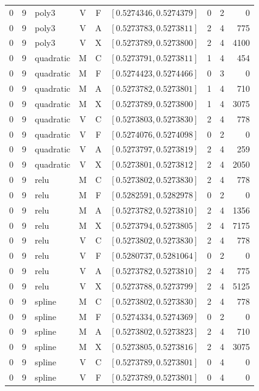 \begin{longtable}{r r l c c l r r r}
0 & 9 & poly3 & V & F & $[0.5274346,0.5274379]$ & 0 & 2 & 0 \\
0 & 9 & poly3 & V & A & $[0.5273783,0.5273811]$ & 2 & 4 & 775 \\
0 & 9 & poly3 & V & X & $[0.5273789,0.5273800]$ & 2 & 4 & 4100 \\
0 & 9 & quadratic & M & C & $[0.5273791,0.5273811]$ & 1 & 4 & 454 \\
0 & 9 & quadratic & M & F & $[0.5274423,0.5274466]$ & 0 & 3 & 0 \\
0 & 9 & quadratic & M & A & $[0.5273782,0.5273801]$ & 1 & 4 & 710 \\
0 & 9 & quadratic & M & X & $[0.5273789,0.5273800]$ & 1 & 4 & 3075 \\
0 & 9 & quadratic & V & C & $[0.5273803,0.5273830]$ & 2 & 4 & 778 \\
0 & 9 & quadratic & V & F & $[0.5274076,0.5274098]$ & 0 & 2 & 0 \\
0 & 9 & quadratic & V & A & $[0.5273797,0.5273819]$ & 2 & 4 & 259 \\
0 & 9 & quadratic & V & X & $[0.5273801,0.5273812]$ & 2 & 4 & 2050 \\
0 & 9 & relu & M & C & $[0.5273802,0.5273830]$ & 2 & 4 & 778 \\
0 & 9 & relu & M & F & $[0.5282591,0.5282978]$ & 0 & 2 & 0 \\
0 & 9 & relu & M & A & $[0.5273782,0.5273810]$ & 2 & 4 & 1356 \\
0 & 9 & relu & M & X & $[0.5273794,0.5273805]$ & 2 & 4 & 7175 \\
0 & 9 & relu & V & C & $[0.5273802,0.5273830]$ & 2 & 4 & 778 \\
0 & 9 & relu & V & F & $[0.5280737,0.5281064]$ & 0 & 2 & 0 \\
0 & 9 & relu & V & A & $[0.5273782,0.5273810]$ & 2 & 4 & 775 \\
0 & 9 & relu & V & X & $[0.5273788,0.5273799]$ & 2 & 4 & 5125 \\
0 & 9 & spline & M & C & $[0.5273802,0.5273830]$ & 2 & 4 & 778 \\
0 & 9 & spline & M & F & $[0.5274334,0.5274369]$ & 0 & 2 & 0 \\
0 & 9 & spline & M & A & $[0.5273802,0.5273823]$ & 2 & 4 & 710 \\
0 & 9 & spline & M & X & $[0.5273805,0.5273816]$ & 2 & 4 & 3075 \\
0 & 9 & spline & V & C & $[0.5273789,0.5273801]$ & 0 & 4 & 0 \\
0 & 9 & spline & V & F & $[0.5273789,0.5273801]$ & 0 & 4 & 0 \\

\end{longtable}
